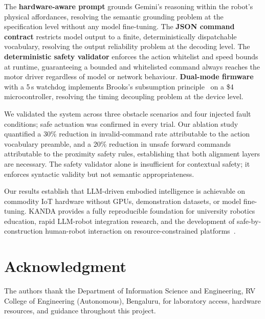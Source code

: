\documentclass[conference]{IEEEtran}
\begin{document}
The \textbf{hardware-aware prompt} grounds Gemini's reasoning within the
robot's physical affordances, resolving the semantic grounding problem at the
specification level without any model fine-tuning.
The \textbf{JSON command contract} restricts model output to a finite,
deterministically dispatchable vocabulary, resolving the output reliability
problem at the decoding level.
The \textbf{deterministic safety validator} enforces the action whitelist and
speed bounds at runtime, guaranteeing a bounded and whitelisted command always
reaches the motor driver regardless of model or network behaviour.
\textbf{Dual-mode firmware} with a 5\,s watchdog implements Brooks's
subsumption principle~\cite{brooks1986robust} on a \$4 microcontroller,
resolving the timing decoupling problem at the device level.

We validated the system across three obstacle scenarios and four injected
fault conditions; safe actuation was confirmed in every trial.
Our ablation study quantified a 30\% reduction in invalid-command rate
attributable to the action vocabulary preamble, and a 20\% reduction in
unsafe forward commands attributable to the proximity safety rules,
establishing that both alignment layers are necessary.
The safety validator alone is insufficient for contextual safety; it enforces
syntactic validity but not semantic appropriateness.

Our results establish that LLM-driven embodied intelligence is achievable on
commodity IoT hardware without GPUs, demonstration datasets, or model
fine-tuning.
KANDA provides a fully reproducible foundation for university robotics
education, rapid LLM-robot integration research, and the development of
safe-by-construction human-robot interaction on resource-constrained
platforms~\cite{merenda2020edge,ray2022tinyml}.

\section*{Acknowledgment}

The authors thank the Department of Information Science and Engineering,
RV College of Engineering (Autonomous), Bengaluru, for laboratory access,
hardware resources, and guidance throughout this project.
\end{document}
